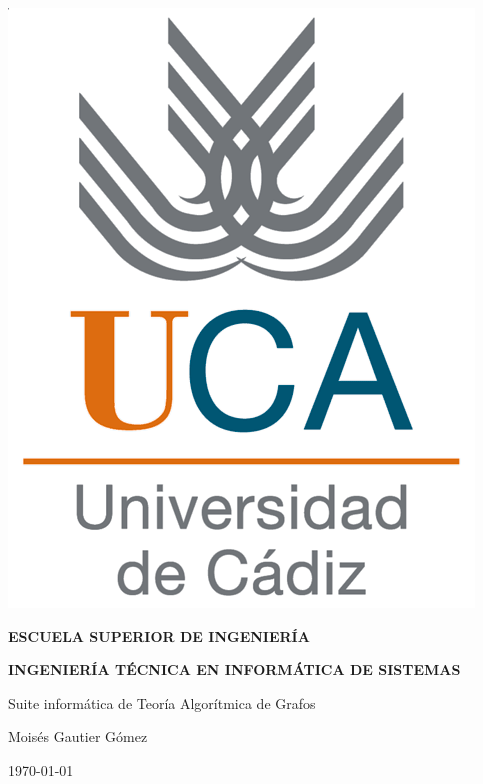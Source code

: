 \pagestyle{empty}
\begin{titlepage}

  \begin{center}

    \includegraphics[scale=0.2]{logo_uca.png} \\

    \vspace{2.0cm}

    \LARGE{\textbf{ESCUELA SUPERIOR DE INGENIERÍA}} \\

    \vspace{1.0cm}

    \Large{\textbf{INGENIERÍA TÉCNICA EN INFORMÁTICA DE SISTEMAS}} \\

    \vspace{3.0cm}

    \Large{Suite informática de Teoría Algorítmica de Grafos} \\

    \vspace{2.0cm}

    \Large{Moisés Gautier Gómez} \\

    \vspace{0.5cm}

    \large{\today}

  \end{center}
\end{titlepage}
